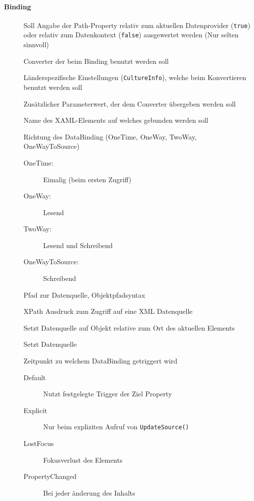 \paragraph{Binding}
\begin{description}
    \item[] Soll Angabe der Path-Property relativ zum aktuellen Datenprovider (\verb+true+) oder relativ zum Datenkontext (\verb+false+) ausgewertet werden (Nur selten sinnvoll)
    \item[] Converter der beim Binding benutzt werden soll
    \item[] Länderspezifische Einstellungen (\verb+CultureInfo+), welche beim Konvertieren benutzt werden soll
    \item[] Zusätzlicher Parameterwert, der dem Converter übergeben werden soll
    \item[] Name des XAML-Elements auf welches gebunden werden soll
    \item[] Richtung des DataBinding (OneTime, OneWay, TwoWay, OneWayToSource)
    \begin{description}
    \item[OneTime:] Eimalig (beim ersten Zugriff)
    \item[OneWay:] Lesend
    \item[TwoWay:] Lesend und Schreibend
    \item[OneWayToSource:] Schreibend
    \end{description}
    \item[] Pfad zur Datenquelle, Objektpfadsyntax
    \item[] XPath Ausdruck zum Zugriff auf eine XML Datenquelle
    \item[] Setzt Datenquelle auf Objekt relative zum Ort des aktuellen Elements
    \item[] Setzt Datenquelle
    \item[] Zeitpunkt zu welchem DataBinding getriggert wird
    \begin{description}
        \item[Default] Nutzt festgelegte Trigger der Ziel Property
        \item[Explicit] Nur beim expliziten Aufruf von \verb+UpdateSource()+
        \item[LostFocus] Fokusverlust des Elements
        \item[PropertyChanged] Bei jeder änderung des Inhalts
    \end{description}
\end{description}


